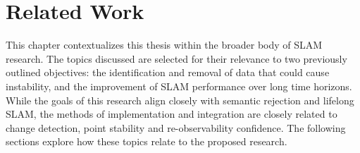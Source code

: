 \section{Related Work}
\label{sec:related_work}

This chapter contextualizes this thesis within the broader body of SLAM research. The topics discussed are selected for their relevance to two previously outlined objectives: the identification and removal of data that could cause instability, and the improvement of SLAM performance over long time horizons. While the goals of this research align closely with semantic rejection and lifelong SLAM, the methods of implementation and integration are closely related to change detection, point stability and re-observability confidence. The following sections explore how these topics relate to the proposed research.

% 